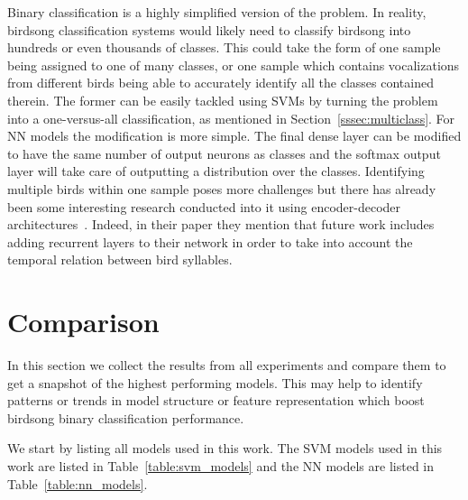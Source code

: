 Binary classification is a highly simplified version of the problem. In reality,
birdsong classification systems would likely need to classify birdsong into
hundreds or even thousands of classes. This could take the form of one sample
being assigned to one of many classes, or one sample which contains
vocalizations from different birds being able to accurately identify all the
classes contained therein. The former can be easily tackled using SVMs by
turning the problem into a one-versus-all classification, as mentioned in
Section~\ref{sssec:multiclass}. For NN models the modification is more simple.
The final dense layer can be modified to have the same number of output neurons
as classes and the softmax output layer will take care of outputting a
distribution over the classes. Identifying multiple birds within one sample
poses more challenges but there has already been some interesting research
conducted into it using encoder-decoder
architectures~\cite{narasimhan2017simultaneous}. Indeed, in their paper they
mention that future work includes adding recurrent layers to their network in
order to take into account the temporal relation between bird syllables.

\section{Comparison}

In this section we collect the results from all experiments and compare them to
get a snapshot of the highest performing models. This may help to identify
patterns or trends in model structure or feature representation which boost
birdsong binary classification performance.

We start by listing all models used in this work. The SVM models used in this
work are listed in Table~\ref{table:svm_models} and the NN models are listed in
Table~\ref{table:nn_models}.

